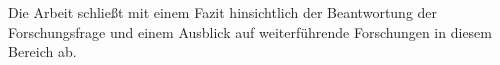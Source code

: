 Die Arbeit schließt mit einem Fazit hinsichtlich der Beantwortung der Forschungsfrage und einem Ausblick auf weiterführende Forschungen in diesem Bereich ab.



